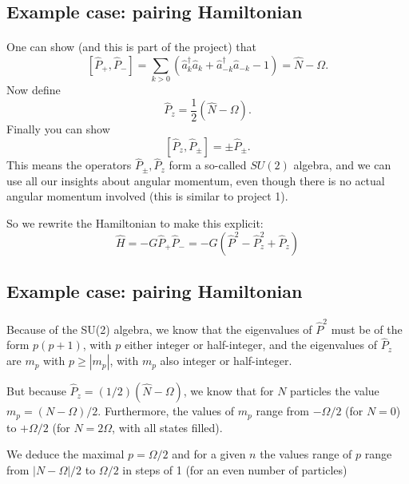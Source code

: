 \documentclass[%
twoside,                 %
final,                   %
10pt]{article}
\begin{document}
\subsection{Example case: pairing Hamiltonian}

\paragraph{}

One can show (and this is part of the project) that
\[
\left [ \hat{P}_+, \hat{P}_- \right ] = \sum_{k> 0} \left( \hat{a}^\dagger_k \hat{a}_k 
+ \hat{a}^\dagger_{-{k}} \hat{a}_{-{k}} - 1 \right) = \hat{N} - \Omega.
\]
Now define 
\[
\hat{P}_z = \frac{1}{2} ( \hat{N} -\Omega).
\]
Finally you can show
\[
\left [ \hat{P}_z , \hat{P}_\pm \right ] = \pm \hat{P}_\pm.
\]
This means the operators $\hat{P}_\pm, \hat{P}_z$ form a so-called  $SU(2)$ algebra, and we can 
use all our insights about angular momentum, even though there is no actual 
angular momentum involved (this is similar to project 1).

So we rewrite the Hamiltonian to make this explicit:
\[
\hat{H} = -G \hat{P}_+ \hat{P}_- 
= -G \left( \hat{P}^2 - \hat{P}_z^2 + \hat{P}_z\right)
\]



\subsection{Example case: pairing Hamiltonian}

\paragraph{}

Because of the SU(2) algebra, we know that the eigenvalues of 
$\hat{P}^2$ must be of the form $p(p+1)$, with $p$ either integer or half-integer, and the eigenvalues of $\hat{P}_z$ 
are $m_p$ with $p \geq | m_p|$, with $m_p$ also integer or half-integer. 


But because $\hat{P}_z = (1/2)(\hat{N}-\Omega)$, we know that for $N$ particles 
the value $m_p = (N-\Omega)/2$. Furthermore, the values of $m_p$ range from 
$-\Omega/2$ (for $N=0$) to $+\Omega/2$ (for $N=2\Omega$, with all states filled). 

We deduce the maximal $p = \Omega/2$ and for a given $n$ the 
values range of $p$ range from $|N-\Omega|/2$ to $\Omega/2$ in steps of 1 
(for an even number of particles) 
\end{document}

